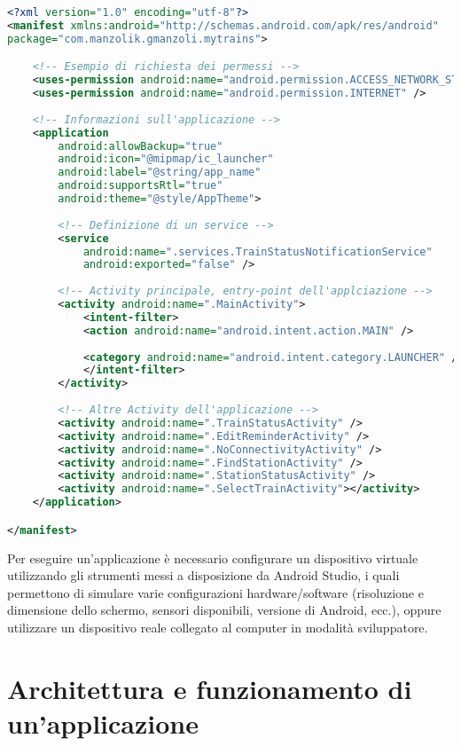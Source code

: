 \begin{lstlisting}[language=XML, caption=Esempiod di \texttt{AndroidManifest.xml}]
<?xml version="1.0" encoding="utf-8"?>
<manifest xmlns:android="http://schemas.android.com/apk/res/android"
package="com.manzolik.gmanzoli.mytrains">

	<!-- Esempio di richiesta dei permessi -->
	<uses-permission android:name="android.permission.ACCESS_NETWORK_STATE" />
	<uses-permission android:name="android.permission.INTERNET" />
	
	<!-- Informazioni sull'applicazione -->
	<application
		android:allowBackup="true"
		android:icon="@mipmap/ic_launcher"
		android:label="@string/app_name"
		android:supportsRtl="true"
		android:theme="@style/AppTheme">
		
		<!-- Definizione di un service -->
		<service
			android:name=".services.TrainStatusNotificationService"
			android:exported="false" />
	
		<!-- Activity principale, entry-point dell'applciazione -->
		<activity android:name=".MainActivity">
			<intent-filter>
			<action android:name="android.intent.action.MAIN" />
			
			<category android:name="android.intent.category.LAUNCHER" />
			</intent-filter>
		</activity>
		
		<!-- Altre Activity dell'applicazione -->
		<activity android:name=".TrainStatusActivity" />
		<activity android:name=".EditReminderActivity" />
		<activity android:name=".NoConnectivityActivity" />
		<activity android:name=".FindStationActivity" />
		<activity android:name=".StationStatusActivity" />
		<activity android:name=".SelectTrainActivity"></activity>
	</application>

</manifest>
\end{lstlisting}

Per eseguire un'applicazione è necessario configurare un dispositivo
virtuale utilizzando gli strumenti messi a disposizione da Android
Studio, i quali permettono di simulare varie configurazioni
hardware/software (risoluzione e dimensione dello schermo, sensori
disponibili, versione di Android, ecc.), oppure utilizzare un
dispositivo reale collegato al computer in modalità sviluppatore.

\section{Architettura e funzionamento di un'applicazione}\label{architettura-e-funzionamento-di-unapplicazione}

